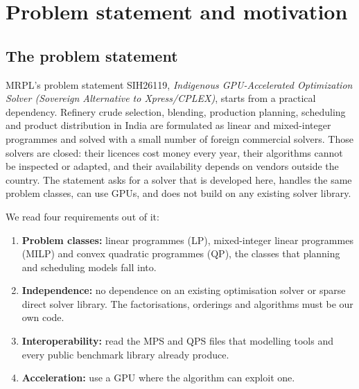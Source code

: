 \section{Problem statement and motivation}\label{sec:intro}

\subsection{The problem statement}
MRPL's problem statement SIH26119, \emph{Indigenous GPU-Accelerated Optimization Solver (Sovereign
Alternative to Xpress/CPLEX)}, starts from a practical dependency. Refinery crude selection,
blending, production planning, scheduling and product distribution in India are formulated as
linear and mixed-integer programmes and solved with a small number of foreign commercial solvers.
Those solvers are closed: their licences cost money every year, their algorithms cannot be
inspected or adapted, and their availability depends on vendors outside the country. The
statement asks for a solver that is developed here, handles the same problem classes, can use
GPUs, and does not build on any existing solver library.

We read four requirements out of it:
\begin{enumerate}[label=\textbf{R\arabic*}]
  \item \textbf{Problem classes:} linear programmes (LP), mixed-integer linear programmes (MILP)
        and convex quadratic programmes (QP), the classes that planning and scheduling models
        fall into.
  \item \textbf{Independence:} no dependence on an existing optimisation solver or sparse direct
        solver library. The factorisations, orderings and algorithms must be our own code.
  \item \textbf{Interoperability:} read the MPS and QPS files that modelling tools and every
        public benchmark library already produce.
  \item \textbf{Acceleration:} use a GPU where the algorithm can exploit one.
\end{enumerate}

